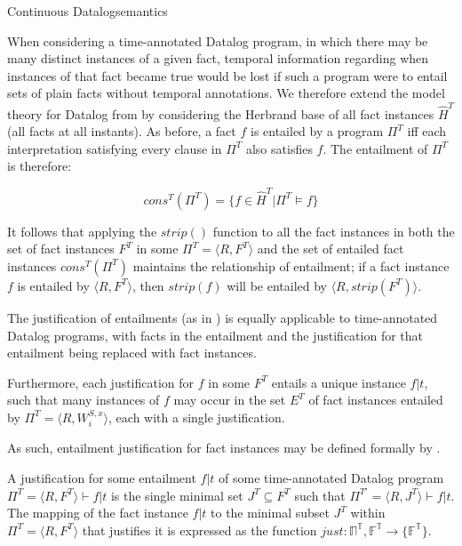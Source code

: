 \begin{nestedsection}{Continuous Datalog}{semantics}
\begin{definition}
When considering a time-annotated Datalog program, in which there may
be many distinct instances of a given fact, temporal information
regarding when instances of that fact became true would be lost if
such a program were to entail sets of plain facts without temporal
annotations. We therefore extend the model theory for Datalog from
 by considering the
Herbrand base of all fact instances $\hat{H}^T$ (all facts at all
instants). As before, a fact $f$ is entailed by a program $\Pi^T$ iff
each interpretation satisfying every clause in $\Pi^T$ also satisfies
$f$. The entailment of $\Pi^T$ is therefore:

\[ cons^T(\Pi^T) = \{ f \in \hat{H}^T | \Pi^T \models f \} \]

It follows that applying the ${strip()}$ function to all the fact
instances in both the set of fact instances $F^T$ in some ${\Pi^T =
  \langle R, F^T \rangle}$ and the set of entailed fact instances
$cons^T(\Pi^T)$ maintains the relationship of entailment; if a fact
instance $f$ is entailed by $\langle R, F^T\rangle$, then $strip(f)$
will be entailed by $\langle R, strip(F^T) \rangle$.
\end{definition}

\begin{definition}

The justification of entailments (as in ) is equally applicable to time-annotated Datalog
programs, with facts in the entailment and the justification for that
entailment being replaced with fact instances.

Furthermore, each justification for $f$ in some $F^T$
entails a unique instance ${f | t}$, such that many instances of $f$
may occur in the set $E^T$ of fact instances entailed by ${\Pi^T =
  \langle R, W^{S,x}_i \rangle}$, each with a single justification.


As such, entailment justification for fact instances may be defined
formally by .




A justification for some entailment ${f|t}$ of some time-annotated Datalog program
	${\Pi^T = \langle R , F^T \rangle \vdash f|t}$ is the single minimal set ${J^T \subseteq F^T}$
	such that ${\Pi^{T\prime} = \langle R , J^T \rangle \vdash f|t}$.
	The mapping of the fact instance ${f | t}$ to the minimal subset $J^T$
	within ${\Pi^T = \langle R, F^T \rangle}$ that justifies it is expressed
	as the function ${just : \mathbb{\Pi^T} , \mathbb{F^T} \rightarrow \{ \mathbb{F^T} \}}$.
\end{definition}


\end{nestedsection}
